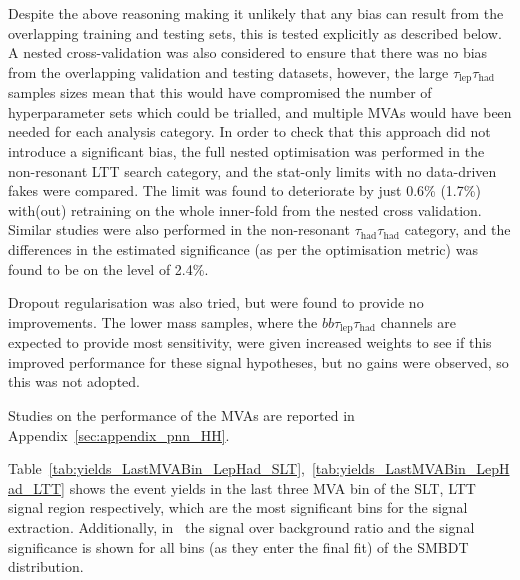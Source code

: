 Despite the above reasoning making it unlikely that any bias can result from the overlapping training and testing sets, this is tested explicitly as described below.
A nested cross-validation was also considered to ensure that there was no bias from the overlapping validation and 
testing datasets, however, the large $\tau_\text{lep}\tau_\text{had}$ samples sizes mean that this would have compromised the number of hyperparameter sets 
which could be trialled, and multiple MVAs would have been needed for each analysis category. In order to check that this approach did not introduce a significant 
bias, the full nested optimisation was performed in the non-resonant LTT search category, and the stat-only limits with no data-driven fakes were compared. The 
limit was found to deteriorate by just 0.6\% (1.7\%) with(out) retraining on the whole inner-fold from the nested cross validation. Similar studies were also performed 
in the non-resonant $\tau_\text{had}\tau_\text{had}$ category, and the differences in the estimated significance (as per the optimisation metric) was found to be on 
the level of 2.4\%.

Dropout regularisation was also tried, but were found to provide no improvements. The lower mass samples, where the $bb\tau_\mathrm{lep}\tau_\mathrm{had}$ 
channels are expected to provide most sensitivity, were given increased weights to see if this improved performance for these signal hypotheses, but no gains were 
observed, so this was not adopted.

Studies on the performance of the MVAs are reported in Appendix~\ref{sec:appendix_pnn_HH}.

Table~\ref{tab:yields_LastMVABin_LepHad_SLT},~\ref{tab:yields_LastMVABin_LepHad_LTT} shows the event yields in the last three MVA bin of the SLT, LTT signal region respectively,
 which are the most significant bins for the signal extraction. Additionally,
in~ the signal over
background ratio and the signal significance is shown for all bins (as
they enter the final fit) of the SMBDT distribution.

